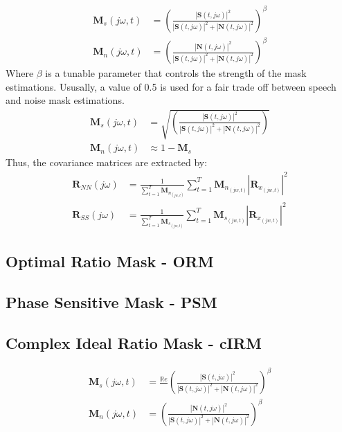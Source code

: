 \begin{align}
    \mathbf{M}_{s}(j\omega, t) & = {\left( \frac{|\mathbf{S}(t,j\omega)|^2}{|\mathbf{S}(t,j\omega)|^2 + |\mathbf{N}(t,j\omega)|^2} \right)}^{\beta} \\
    \mathbf{M}_{n}(j\omega, t) & = {\left( \frac{|\mathbf{N}(t,j\omega)|^2}{|\mathbf{S}(t,j\omega)|^2 + |\mathbf{N}(t,j\omega)|^2} \right)}^{\beta}
\end{align}
%
Where \(\beta \) is a tunable parameter that controls the strength of the mask estimations. Ususally, a value of 0.5 is used 
for a fair trade off between speech and noise mask estimations.
%
\begin{align}
    \mathbf{M}_{s}(j\omega, t) & = \sqrt{\left( \frac{|\mathbf{S}(t,j\omega)|^2}{|\mathbf{S}(t,j\omega)|^2 + |\mathbf{N}(t,j\omega)|^2} \right)} \\
    \mathbf{M}_{n}(j\omega, t) & \approx 1 - \mathbf{M}_{s}
\end{align}
%
Thus, the covariance matrices are extracted by:
\begin{align}
    \mathbf{R}_{NN}(j\omega) & = \frac{1}{\sum\limits_{t=1}^{T}\mathbf{M}_{n_{(jw, t)}}}\sum_{t=1}^{T}\mathbf{M}_{n_{(jw, t)}}|\mathbf{R}_{x_{(jw, t)}}|^2\\
    \mathbf{R}_{SS}(j\omega) & = \frac{1}{\sum\limits_{t=1}^{T}\mathbf{M}_{s_{(jw, t)}}}\sum_{t=1}^{T}\mathbf{M}_{s_{(jw, t)}}|\mathbf{R}_{x_{(jw, t)}}|^2
\end{align}

\subsection{Optimal Ratio Mask - ORM}
\subsection{Phase Sensitive Mask - PSM}



\subsection{Complex Ideal Ratio Mask - cIRM}
\begin{align}
    \mathbf{M}_{s}(j\omega, t) & = \frac{ \mathbb{R}e }{  }  {\left( \frac{|\mathbf{S}(t,j\omega)|^2}{|\mathbf{S}(t,j\omega)|^2 + |\mathbf{N}(t,j\omega)|^2} \right)}^{\beta}                           \\
    \mathbf{M}_{n}(j\omega, t) & = {\left( \frac{|\mathbf{N}(t,j\omega)|^2}{|\mathbf{S}(t,j\omega)|^2 + |\mathbf{N}(t,j\omega)|^2} \right)}^{\beta}
\end{align}